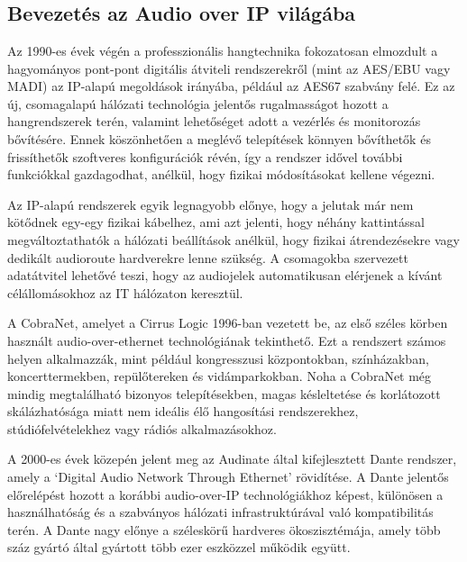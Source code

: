 \chapter{\AudioOverIp}
\section{Bevezetés az Audio over IP világába}
Az 1990-es évek végén a professzionális hangtechnika fokozatosan elmozdult a hagyományos pont-pont 
digitális átviteli rendszerekről (mint az AES/EBU vagy MADI) az IP-alapú megoldások irányába, például az AES67 szabvány felé. 
Ez az új, csomagalapú hálózati technológia jelentős rugalmasságot hozott a hangrendszerek terén, valamint lehetőséget adott 
a vezérlés és monitorozás bővítésére. Ennek köszönhetően a meglévő telepítések könnyen bővíthetők és frissíthetők szoftveres 
konfigurációk révén, így a rendszer idővel további funkciókkal gazdagodhat, anélkül, hogy fizikai módosításokat kellene végezni.

Az IP-alapú rendszerek egyik legnagyobb előnye, hogy a jelutak már nem kötődnek egy-egy fizikai kábelhez, 
ami azt jelenti, hogy néhány kattintással megváltoztathatók a hálózati beállítások anélkül, hogy fizikai 
átrendezésekre vagy dedikált audioroute hardverekre lenne szükség. A csomagokba szervezett adatátvitel 
lehetővé teszi, hogy az audiojelek automatikusan elérjenek a kívánt célállomásokhoz az IT hálózaton keresztül.

A CobraNet, amelyet a Cirrus Logic 1996-ban vezetett be, az első széles körben használt audio-over-ethernet 
technológiának tekinthető. Ezt a rendszert számos helyen alkalmazzák, mint például kongresszusi 
központokban, színházakban, koncerttermekben, repülőtereken és vidámparkokban. 
Noha a CobraNet még mindig megtalálható bizonyos telepítésekben, magas késleltetése és 
korlátozott skálázhatósága miatt nem ideális élő hangosítási rendszerekhez, stúdiófelvételekhez vagy rádiós alkalmazásokhoz.

A 2000-es évek közepén jelent meg az Audinate által kifejlesztett Dante rendszer, amely a `Digital Audio Network Through Ethernet' rövidítése. 
A Dante jelentős előrelépést hozott a korábbi audio-over-IP technológiákhoz képest, különösen a 
használhatóság és a szabványos hálózati infrastruktúrával való kompatibilitás terén. 
A Dante nagy előnye a széleskörű hardveres ökoszisztémája, amely több száz gyártó által gyártott több ezer eszközzel működik együtt.


